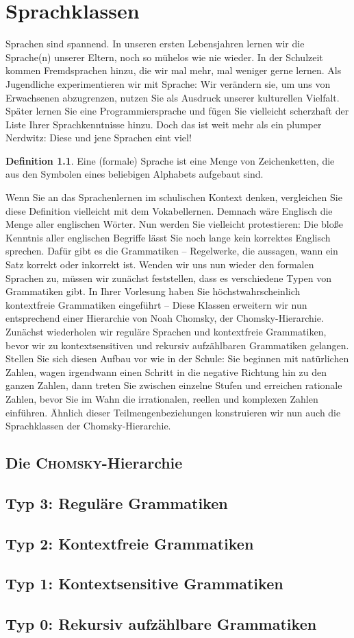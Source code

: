 \documentclass[11pt,a4paper]{scrreport}
\theoremstyle{remark}
\theoremstyle{definition}
\newtheorem{definition}{Definition}[section]
\begin{document}
\chapter{Sprachklassen}
Sprachen sind spannend. In unseren ersten Lebensjahren lernen wir die Sprache(n) unserer Eltern, noch so mühelos wie nie wieder. In der Schulzeit kommen Fremdsprachen hinzu, die wir mal mehr, mal weniger gerne lernen. Als Jugendliche experimentieren wir mit Sprache: Wir verändern sie, um uns von Erwachsenen abzugrenzen, nutzen Sie als Ausdruck unserer kulturellen Vielfalt. Später lernen Sie eine Programmiersprache und fügen Sie vielleicht scherzhaft der Liste Ihrer Sprachkenntnisse hinzu. Doch das ist weit mehr als ein plumper Nerdwitz: Diese und jene Sprachen eint viel!
\begin{definition}
Eine (formale) Sprache ist eine Menge von Zeichenketten, die aus den Symbolen eines beliebigen Alphabets aufgebaut sind. 
\end{definition}
Wenn Sie an das Sprachenlernen im schulischen Kontext denken, vergleichen Sie diese Definition vielleicht mit dem Vokabellernen. Demnach wäre Englisch die Menge aller englischen Wörter. Nun werden Sie vielleicht protestieren: Die bloße Kenntnis aller englischen Begriffe lässt Sie noch lange kein korrektes Englisch sprechen. Dafür gibt es die Grammatiken -- Regelwerke, die aussagen, wann ein Satz korrekt oder inkorrekt ist. Wenden wir uns nun wieder den formalen Sprachen zu, müssen wir zunächst feststellen, dass es verschiedene Typen von Grammatiken gibt. In Ihrer Vorlesung haben Sie höchstwahrscheinlich kontextfreie Grammatiken eingeführt -- Diese Klassen erweitern wir nun entsprechend einer Hierarchie von Noah Chomsky, der Chomsky-Hierarchie. Zunächst wiederholen wir reguläre Sprachen und kontextfreie Grammatiken, bevor wir zu kontextsensitiven und rekursiv aufzählbaren Grammatiken gelangen. Stellen Sie sich diesen Aufbau vor wie in der Schule: Sie beginnen mit natürlichen Zahlen, wagen irgendwann einen Schritt in die negative Richtung hin zu den ganzen Zahlen, dann treten Sie zwischen einzelne Stufen und erreichen rationale Zahlen, bevor Sie im Wahn die irrationalen, reellen und komplexen Zahlen einführen. Ähnlich dieser Teilmengenbeziehungen konstruieren wir nun auch die Sprachklassen der Chomsky-Hierarchie.
\section{Die \textsc{Chomsky}-Hierarchie}
\section{Typ 3: Reguläre Grammatiken}
\section{Typ 2: Kontextfreie Grammatiken}
\section{Typ 1: Kontextsensitive Grammatiken}
\section{Typ 0: Rekursiv aufzählbare Grammatiken}
\end{document}
